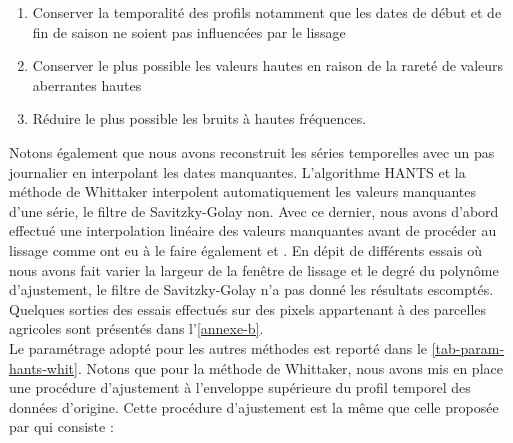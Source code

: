 \begin{enumerate}
 \item Conserver la temporalité des profils notamment que les dates de début et de fin de saison ne soient pas influencées par le lissage
 \item Conserver le plus possible les valeurs hautes en raison de la rareté de valeurs aberrantes hautes
 \item Réduire le plus possible les bruits à hautes fréquences.
\end{enumerate}
Notons également que nous avons reconstruit les séries temporelles avec un pas journalier en interpolant les dates manquantes. L'algorithme HANTS et la méthode de Whittaker interpolent automatiquement les valeurs manquantes d'une série, le filtre de Savitzky-Golay non. Avec ce dernier, nous avons d'abord effectué une interpolation linéaire des valeurs manquantes avant de procéder au lissage comme ont eu à le faire également \citet{Chen2004} et \citet{Liu2017}. 
En dépit de différents essais où nous avons fait varier la largeur de la fenêtre de lissage et le degré du polynôme d'ajustement, le filtre de Savitzky-Golay n'a pas donné les résultats escomptés. Quelques sorties des essais effectués sur des pixels appartenant à des parcelles agricoles sont présentés dans l'\cref{annexe-b}.
\\Le paramétrage adopté pour les autres méthodes est reporté dans le \cref{tab-param-hants-whit}. Notons que pour la méthode de Whittaker, nous avons mis en place une procédure d'ajustement à l'enveloppe supérieure du profil temporel des données d'origine. Cette procédure d'ajustement est la même que celle proposée par \citet{Chen2004} qui consiste : 
